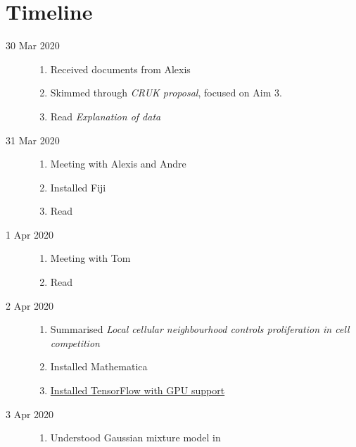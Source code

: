 \section{Timeline}
\label{sec:timeline}

\begin{description}
    \item[30 Mar 2020] \mbox{}
    \begin{enumerate}
        \item Received documents from Alexis
        \item Skimmed through \textit{CRUK proposal}, focused on Aim 3.
        \item Read \textit{Explanation of data}
    \end{enumerate}
    
    \item[31 Mar 2020] \mbox{}
    \begin{enumerate}
        \item Meeting with Alexis and Andre
        \item Installed Fiji
        \item Read \cite{bove2017local}
    \end{enumerate}

    \item[1 Apr 2020] \mbox{}
    \begin{enumerate}
        \item Meeting with Tom
        \item Read \cite{bove2017local}
    \end{enumerate}
    
    \item[2 Apr 2020] \mbox{}
    \begin{enumerate}
        \item Summarised \cite{bove2017local} \textit{Local cellular neighbourhood controls proliferation in cell competition}
        \item Installed Mathematica
        \item \href{https://gist.github.com/qin-yu/d3619a68d209dd1feefd7385e43c3fc4}{Installed TensorFlow with GPU support}
    \end{enumerate}
    
    \item[3 Apr 2020] \mbox{}
    \begin{enumerate}
        \item Understood Gaussian mixture model in \cite{bove2017local}
    \end{enumerate}
\end{description}
